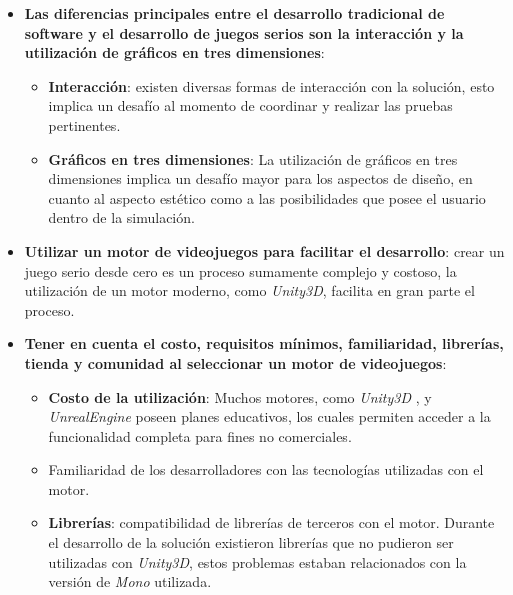 \begin{itemize}

\item \textbf{Las diferencias principales entre el desarrollo tradicional de software 
        y el desarrollo de juegos serios son la interacción y la utilización de
        gráficos en tres dimensiones}: 

    \begin{itemize}

    \item \textbf{Interacción}: existen diversas formas de interacción con la
        solución, esto implica un desafío al momento de coordinar y realizar las
        pruebas pertinentes.

    \item \textbf{Gráficos en tres dimensiones}: La utilización de gráficos en
        tres dimensiones implica un desafío mayor para los aspectos de diseño,
        en cuanto al aspecto estético como a las posibilidades que posee el
        usuario dentro de la simulación.

    \end{itemize}

    \item \textbf{Utilizar un motor de videojuegos para facilitar el
            desarrollo}: crear un juego serio desde cero es un proceso sumamente
        complejo y costoso, la utilización de un motor moderno, como
        \emph{Unity3D}, facilita en gran parte el proceso. 

    \item \textbf{Tener en cuenta el costo, requisitos mínimos, familiaridad,
        librerías, tienda y comunidad al seleccionar un motor de videojuegos}:
        
    \begin{itemize}

    \item \textbf{Costo de la utilización}: Muchos motores, como \emph{Unity3D}
        , y \emph{UnrealEngine} poseen planes educativos, los cuales permiten acceder a 
        la funcionalidad completa para fines no comerciales.

    \item Familiaridad de los desarrolladores con las tecnologías
        utilizadas con el motor.

    \item \textbf{Librerías}: compatibilidad de librerías de terceros con el
        motor. Durante el desarrollo de la solución existieron librerías que no
        pudieron ser utilizadas con \emph{Unity3D}, estos problemas estaban
        relacionados con la versión de \emph{Mono} utilizada.


\end{itemize}
\end{itemize}
